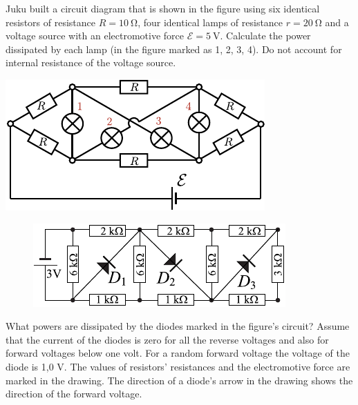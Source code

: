 \documentclass[11pt]{article}
\begin{document}

\probeng
Juku built a circuit diagram that is shown in the figure using six identical resistors of resistance $R=\SI{10}{\ohm}$, four identical lamps of resistance $r=\SI{20}{\ohm}$ and a voltage source with an electromotive force $\mathcal{E}=\SI{5}{\volt}$. Calculate the power dissipated by each lamp (in the figure marked as 1, 2, 3, 4). Do not account for internal resistance of the voltage source.
\begin{center}
\includegraphics[width=0.6\linewidth]{2013-lahg-09-lambidJoonis-crop}
\end{center}
\probend
\bigskip


\probeng
\begin{figure}
\includegraphics[width=\linewidth]{2012-lahg-08-dioodid}
\end{figure}
What powers are dissipated by the diodes marked in the figure’s circuit? Assume that the current of the diodes is zero for all the reverse voltages and also for forward voltages below one volt. For a random forward voltage the voltage of the diode is 1,0 V. The values of resistors’ resistances and the electromotive force are marked in the drawing. The direction of a diode’s arrow in the drawing shows the direction of the forward voltage.
\probend
\bigskip

\end{document}
